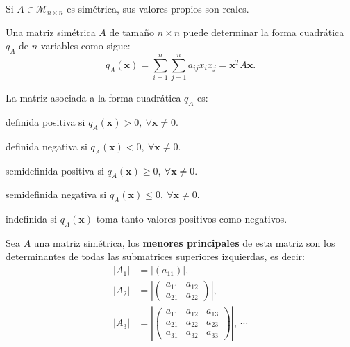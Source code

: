 \documentclass[8pt,a4paper]{extarticle}
\begin{document}
\begin{multicols}{3}
	\begin{boxtheo}[]
		Si $A \in \mathcal{M}_{n \times n}$ es simétrica, sus valores propios son reales.
	\end{boxtheo}

	\begin{boxtheo}[]
		Una matriz simétrica $A$ de tamaño $n \times n$ puede determinar la forma cuadrática $q_A$ de $n$ variables como sigue:
		\[
			q_A (\mathbf{x}) = \sum_{i = 1}^n \sum_{j = 1}^n a_{ij}x_ix_j = \mathbf{x}^T A \mathbf{x}
			.\]
	\end{boxtheo}

	\begin{boxcor}
		La matriz asociada a la forma cuadrática $q_A$ es:
		\begin{eqlist}
			\item definida positiva si $q_A(\mathbf{x}) > 0,\ \forall \mathbf{x} \neq 0$.
			\item definida negativa si $q_A(\mathbf{x}) < 0,\ \forall \mathbf{x} \neq 0$.
			\item semidefinida positiva si $q_A(\mathbf{x}) \ge 0,\ \forall \mathbf{x} \neq 0$.
			\item semidefinida negativa si $q_A(\mathbf{x}) \le 0,\ \forall \mathbf{x} \neq 0$.
			\item indefinida si $q_A(\mathbf{x})$ toma tanto valores positivos como negativos.
		\end{eqlist}
	\end{boxcor}

	\begin{boxdef}
		Sea $A$ una matriz simétrica, los \textbf{menores principales} de esta matriz son los determinantes de todas las submatrices superiores izquierdas, es decir:
		\begin{align*}
			\left| A_1 \right| & = \left| (a_{11}) \right|,                            \\
			\left| A_2 \right| & = \left| \begin{pmatrix} a_{11} & a_{12} \\ a_{21} & a_{22} \end{pmatrix}  \right|,         \\
			\left| A_3 \right| & = \left| \begin{pmatrix} a_{11} & a_{12} & a_{13} \\ a_{21} & a_{22} & a_{23} \\ a_{31} & a_{32} & a_{33} \end{pmatrix}  \right|,\ \cdots
		\end{align*}
	\end{boxdef}


\end{multicols}
\end{document}
